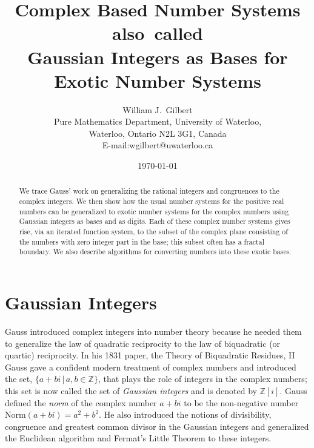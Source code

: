 \documentclass[12pt]{article}
\newcommand{\Z}{\mathbb{Z}}
\begin{document}
\title{Complex Based Number Systems\\
\mbox{\normalsize also called}\\
Gaussian Integers as Bases for Exotic Number Systems}
\author{
{William J.\ Gilbert}\\[2mm]
Pure Mathematics Department, University of Waterloo,\\
 Waterloo, Ontario N2L 3G1, Canada\\
{\small E-mail:wgilbert{@}uwaterloo.ca}}
\date{\today}

\maketitle

\begin{abstract}
We trace Gauss' work on generalizing the rational integers and congruences to the complex integers. We then show how the usual number
systems for the positive real numbers can be generalized to exotic number systems for the complex numbers using Gaussian integers as bases
and as digits. Each of these complex number systems gives rise, via an
iterated function system, to the subset of the complex plane consisting
of the numbers with zero integer part in the base; this subset often
has a fractal boundary.  We also describe algorithms for converting
numbers into these exotic bases.
\smallskip


\end{abstract}

\section{Gaussian Integers}

Gauss introduced complex integers into number theory because he needed
them to generalize the law of quadratic reciprocity to the law of biquadratic
(or quartic) reciprocity.  In his 1831 paper, the Theory of Biquadratic
Residues, II \cite{gauss} Gauss gave a confident modern treatment of complex numbers and introduced the set, $\{a+bi\,|\,a,b\in\Z\}$, that plays the role of integers in the complex numbers; this set is now called the set of \emph{Gaussian integers} and is denoted by $\Z[i]$.  
Gauss defined the \emph{norm} of the complex number $a + bi$ to be the non-negative number $\mbox{Norm}(a + bi) = a^2 + b^2$. He also introduced the notions of divisibility, congruence and greatest common divisor in
the Gaussian integers and generalized the Euclidean algorithm and Fermat's
Little Theorem to these integers.
\smallskip
\end{document}
